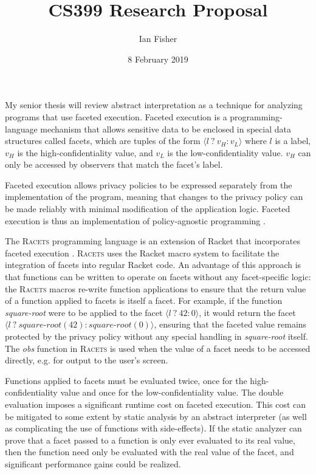 \documentclass{article}
\title{CS399 Research Proposal}
\author{Ian Fisher}
\date{8 February 2019}
\begin{document}
\maketitle

My senior thesis will review abstract interpretation as a technique for analyzing programs that use faceted execution. Faceted execution is a programming-language mechanism that allows sensitive data to be enclosed in special data structures called facets, which are tuples of the form $\langle l\ ?\ v_H : v_L \rangle$ where $l$ is a label, $v_H$ is the high-confidentiality value, and $v_L$ is the low-confidentiality value. $v_H$ can only be accessed by observers that match the facet's label.

Faceted execution allows privacy policies to be expressed separately from the implementation of the program, meaning that changes to the privacy policy can be made reliably with minimal modification of the application logic. Faceted execution is thus an implementation of policy-agnostic programming \cite{faceted}.

The \textsc{Racets} programming language is an extension of Racket that incorporates faceted execution \cite{racets}. \textsc{Racets} uses the Racket macro system to facilitate the integration of facets into regular Racket code. An advantage of this approach is that functions can be written to operate on facets without any facet-specific logic: the \textsc{Racets} macros re-write function applications to ensure that the return value of a function applied to facets is itself a facet. For example, if the function \textit{square-root} were to be applied to the facet $\langle l \ ?\ 42 : 0 \rangle$, it would return the facet $\langle l \ ?\ \textit{square-root}(42) : \textit{square-root}(0) \rangle$, ensuring that the faceted value remains protected by the privacy policy without any special handling in \textit{square-root} itself. The \textit{obs} function in \textsc{Racets} is used when the value of a facet needs to be accessed directly, e.g. for output to the user's screen.

Functions applied to facets must be evaluated twice, once for the high-confidentiality value and once for the low-confidentiality value. The double evaluation imposes a significant runtime cost on faceted execution. This cost can be mitigated to some extent by static analysis by an abstract interpreter (as well as complicating the use of functions with side-effects). If the static analyzer can prove that a facet passed to a function is only ever evaluated to its real value, then the function need only be evaluated with the real value of the facet, and significant performance gains could be realized.
\end{document}

